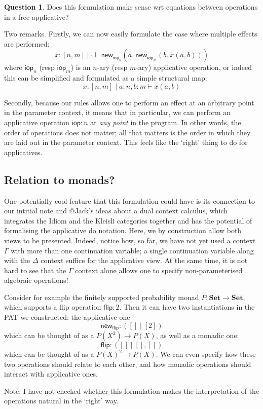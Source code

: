 \documentclass{article}
\theoremstyle{definition}
\newtheorem{question}[thm]{Question}
\theoremstyle{remark}
\newcommand{\Set}{\mathbf{Set}}
\newcommand{\opnew}{\mathsf{new}}
\newcommand{\opflip}{\mathsf{flip}}
\newcommand{\idiomop}{\mathsf{iop}}
\begin{document}
\begin{question}
  Does this formulation make sense wrt equations between operations in a free applicative? 
\end{question}

Two remarks. Firstly, we can now easily formulate the case where multiple effects are performed:
\[
x: [n, m] \mid \cdot \vdash \opnew_{\idiomop_n}(a. \ \opnew_{\idiomop_m}(b. \ x(a, b)))
\]
where $\idiomop_n$ (resp $\idiomop_m$) is an $n$-ary (resp $m$-ary) applicative operation,
or indeed this can be simplified and formulated as a simple structural map:
\[
x: [n, m] \mid a: n, b: m \vdash x(a, b)
\]

Secondly, because our rules allows one to perform an effect at an arbitrary point in the parameter context, it means that in particular, we can perform an applicative operation $\idiomop: n$ at \emph{any point} in the program. In other words, the order of operations does not matter; all that matters is the order in which they are laid out in the parameter context. This feels like the `right' thing to do for applicatives.

\subsection{Relation to monads?}
One potentially cool feature that this formulation could have is its connection to our intitial note and @Jack's ideas about a dual context calculus, which integrates the Idiom and the Kleisli categories together and has the potential of formalising the applicative do notation. Here, we by construction allow both views to be presented. Indeed, notice how, so far, we have not yet used a context $\Gamma$ with more than one continuation variable; a single continuation variable along with the $\Delta$ context suffice for the applicative view. At the same time, it is not hard to see that the $\Gamma$ context alone allows one to specify non-parameterised algebraic operations! 

Consider for example the finitely supported probability monad $P: \Set \to \Set$, which supports a flip operation $\opflip: 2$. Then it can have two instantiations in the PAT we constructed: the applicative one
\[
\opnew_{\opflip}: ([] \mid [2])
\]
which can be thought of as a $P(X^2) \to P(X)$, as well as a monadic one:
\[
\opflip: ([] \mid [], [])
\]
which can be thought of as a $P(X)^2 \to P(X)$. We can even specify how these two operations should relate to each other, and how monadic operations should interact with applicative ones. 

Note: I have not checked whether this formulation makes the interpretation of the operations natural in the `right' way. 



\end{document}
